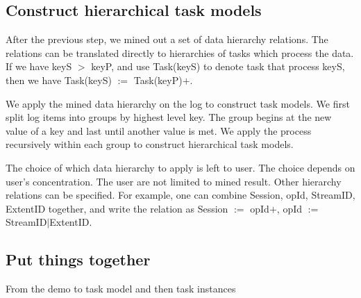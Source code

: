 \subsection{Construct hierarchical task models}


After the previous step, we mined out a set of data
hierarchy relations. The relations can be translated
directly to hierarchies of tasks which process the data. 
If we have keyS $>$ keyP, and use Task(keyS) to denote task
that process keyS, then we have Task(keyS) $:=$
Task(keyP)$+$.

We apply the mined data hierarchy on the log to construct
task models. We first split log items into groups by highest
level key. The group begins at the new value of a key and
last until another value is met. We apply the process
recursively within each group to construct hierarchical task
models.


The choice of which data hierarchy to apply is left to user.
The choice depends on user's concentration. The user are not
limited to mined result. Other hierarchy relations can be
specified. For example, one can combine Session, opId,
StreamID, ExtentID together, and write the relation as
Session $:=$ opId$+$, opId $:=$ StreamID$|$ExtentID.


\subsection{Put things together}

From the demo to task model and then task instances


